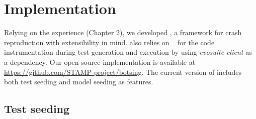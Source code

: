 
\section{Implementation}\label{sec:model_seeding:implementation}



Relying on the \evocrash experience (Chapter 2),  we developed \botsing, a framework for crash reproduction with extensibility in mind.
 \botsing also relies on \evosuite~\cite{Fraser2011} for the code instrumentation during test generation and execution by using \textit{evosuite-client} as a dependency.
Our open-source implementation is available at \url{https://github.com/STAMP-project/botsing}. The current version of \botsing includes both test seeding and model seeding as features.



\subsection{Test seeding}

